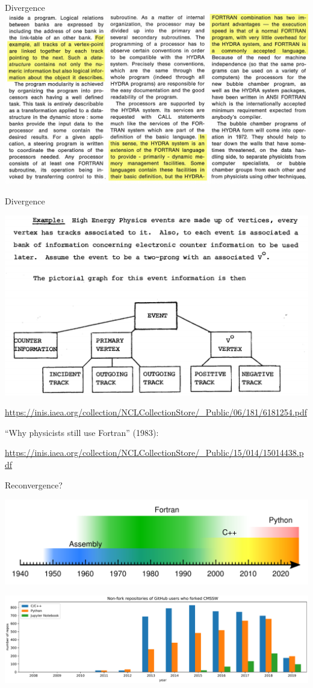 \documentclass[aspectratio=169]{beamer}
\begin{document}
\begin{frame}{Divergence}
\vspace{0.25 cm}
\includegraphics[width=\linewidth]{hydra-1.png}
\end{frame}

\begin{frame}{Divergence}
\scriptsize
\vspace{0.25 cm}
\begin{center}
\includegraphics[width=0.7\linewidth]{hydra-2.png}
\end{center}

\textcolor{blue}{\url{https://inis.iaea.org/collection/NCLCollectionStore/_Public/06/181/6181254.pdf}}

\vspace{0.4 cm}
``Why physicists still use Fortran'' (1983):

\vspace{0.1 cm}
\textcolor{blue}{\url{https://inis.iaea.org/collection/NCLCollectionStore/_Public/15/014/15014438.pdf}}
\end{frame}

\begin{frame}{Reconvergence?}
\begin{center}
\includegraphics[width=0.95\linewidth]{programming-languages.pdf}

\vspace{0.25 cm}
\includegraphics[width=0.95\linewidth]{github-cmssw-lin.pdf}
\end{center}
\end{frame}
\end{document}
